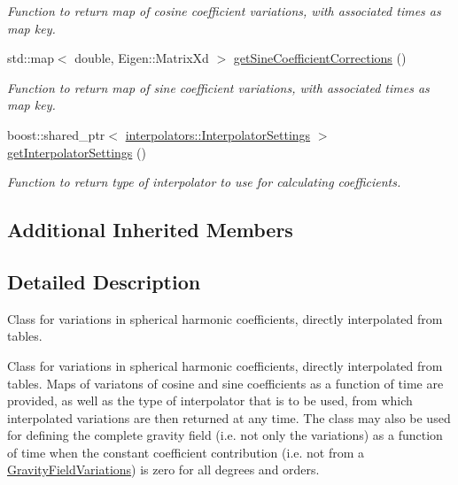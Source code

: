 \begin{DoxyCompactItemize}
\begin{DoxyCompactList}\small\item\em Function to return map of cosine coefficient variations, with associated times as map key. \end{DoxyCompactList}\item 
std\+::map$<$ double, Eigen\+::\+Matrix\+Xd $>$ \hyperlink{classtudat_1_1gravitation_1_1TabulatedGravityFieldVariations_a32b4fd0498d6192426d075fddbd1ee38}{get\+Sine\+Coefficient\+Corrections} ()
\begin{DoxyCompactList}\small\item\em Function to return map of sine coefficient variations, with associated times as map key. \end{DoxyCompactList}\item 
boost\+::shared\+\_\+ptr$<$ \hyperlink{classtudat_1_1interpolators_1_1InterpolatorSettings}{interpolators\+::\+Interpolator\+Settings} $>$ \hyperlink{classtudat_1_1gravitation_1_1TabulatedGravityFieldVariations_aac25377191967ae3f51e7d35c3002545}{get\+Interpolator\+Settings} ()
\begin{DoxyCompactList}\small\item\em Function to return type of interpolator to use for calculating coefficients. \end{DoxyCompactList}\end{DoxyCompactItemize}
\subsection*{Additional Inherited Members}


\subsection{Detailed Description}
Class for variations in spherical harmonic coefficients, directly interpolated from tables. 

Class for variations in spherical harmonic coefficients, directly interpolated from tables. Maps of variatons of cosine and sine coefficients as a function of time are provided, as well as the type of interpolator that is to be used, from which interpolated variations are then returned at any time. The class may also be used for defining the complete gravity field (i.\+e. not only the variations) as a function of time when the constant coefficient contribution (i.\+e. not from a \hyperlink{classtudat_1_1gravitation_1_1GravityFieldVariations}{Gravity\+Field\+Variations}) is zero for all degrees and orders. 

